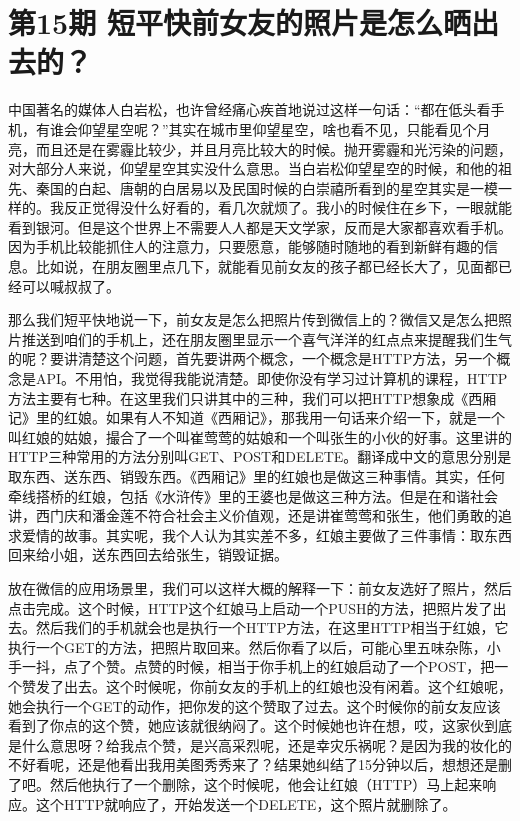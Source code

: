 \documentclass[
  letterpaper,
  DIV=11,
  numbers=noendperiod]{scrreprt}
\begin{document}

\chapter{第15期
短平快前女友的照片是怎么晒出去的？}\label{ux7b2c15ux671f-ux77edux5e73ux5febux524dux5973ux53cbux7684ux7167ux7247ux662fux600eux4e48ux6652ux51faux53bbux7684}

中国著名的媒体人白岩松，也许曾经痛心疾首地说过这样一句话：``都在低头看手机，有谁会仰望星空呢？''其实在城市里仰望星空，啥也看不见，只能看见个月亮，而且还是在雾霾比较少，并且月亮比较大的时候。抛开雾霾和光污染的问题，对大部分人来说，仰望星空其实没什么意思。当白岩松仰望星空的时候，和他的祖先、秦国的白起、唐朝的白居易以及民国时候的白崇禧所看到的星空其实是一模一样的。我反正觉得没什么好看的，看几次就烦了。我小的时候住在乡下，一眼就能看到银河。但是这个世界上不需要人人都是天文学家，反而是大家都喜欢看手机。因为手机比较能抓住人的注意力，只要愿意，能够随时随地的看到新鲜有趣的信息。比如说，在朋友圈里点几下，就能看见前女友的孩子都已经长大了，见面都已经可以喊叔叔了。

那么我们短平快地说一下，前女友是怎么把照片传到微信上的？微信又是怎么把照片推送到咱们的手机上，还在朋友圈里显示一个喜气洋洋的红点点来提醒我们生气的呢？要讲清楚这个问题，首先要讲两个概念，一个概念是HTTP方法，另一个概念是API。不用怕，我觉得我能说清楚。即使你没有学习过计算机的课程，HTTP方法主要有七种。在这里我们只讲其中的三种，我们可以把HTTP想象成《西厢记》里的红娘。如果有人不知道《西厢记》，那我用一句话来介绍一下，就是一个叫红娘的姑娘，撮合了一个叫崔莺莺的姑娘和一个叫张生的小伙的好事。这里讲的HTTP三种常用的方法分别叫GET、POST和DELETE。翻译成中文的意思分别是取东西、送东西、销毁东西。《西厢记》里的红娘也是做这三种事情。其实，任何牵线搭桥的红娘，包括《水浒传》里的王婆也是做这三种方法。但是在和谐社会讲，西门庆和潘金莲不符合社会主义价值观，还是讲崔莺莺和张生，他们勇敢的追求爱情的故事。其实呢，我个人认为其实差不多，红娘主要做了三件事情：取东西回来给小姐，送东西回去给张生，销毁证据。

放在微信的应用场景里，我们可以这样大概的解释一下：前女友选好了照片，然后点击完成。这个时候，HTTP这个红娘马上启动一个PUSH的方法，把照片发了出去。然后我们的手机就会也是执行一个HTTP方法，在这里HTTP相当于红娘，它执行一个GET的方法，把照片取回来。然后你看了以后，可能心里五味杂陈，小手一抖，点了个赞。点赞的时候，相当于你手机上的红娘启动了一个POST，把一个赞发了出去。这个时候呢，你前女友的手机上的红娘也没有闲着。这个红娘呢，她会执行一个GET的动作，把你发的这个赞取了过去。这个时候你的前女友应该看到了你点的这个赞，她应该就很纳闷了。这个时候她也许在想，哎，这家伙到底是什么意思呀？给我点个赞，是兴高采烈呢，还是幸灾乐祸呢？是因为我的妆化的不好看呢，还是他看出我用美图秀秀来了？结果她纠结了15分钟以后，想想还是删了吧。然后他执行了一个删除，这个时候呢，他会让红娘（HTTP）马上起来响应。这个HTTP就响应了，开始发送一个DELETE，这个照片就删除了。
\end{document}
